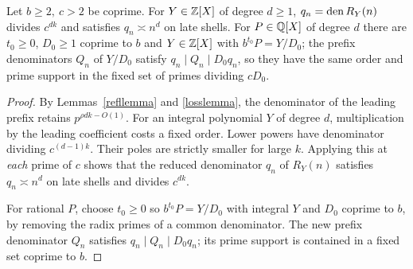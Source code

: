 \documentclass[11pt]{article}
\begin{document}
\begin{lemma}\label{poles}
Let \(b\ge2,\ c>2\) be coprime. For \(Y\in\mathbb Z[X]\) of degree \(d\ge1\), \(q_n=\operatorname{den} R_Y(n)\) divides
\(c^{dk}\) and satisfies \(q_n\asymp n^d\) on late shells.
For \(P\in\mathbb Q[X]\) of degree \(d\) there are \(t_0\ge0\), \(D_0\ge1\) coprime
to \(b\) and \(Y\in\mathbb Z[X]\) with \(b^{t_0}P=Y/D_0\); the prefix denominators
\(Q_n\) of \(Y/D_0\) satisfy \(q_n\mid Q_n\mid D_0q_n\), so they have the same
order and prime support in the fixed set of primes dividing \(cD_0\).
\end{lemma}
\begin{proof}
By Lemmas~\ref{refllemma} and \ref{losslemma}, the denominator of
the leading prefix retains \(p^{\rho dk-O(1)}\).
For an integral polynomial \(Y\) of degree \(d\), multiplication by the
leading coefficient costs a fixed order. Lower powers have denominator
dividing \(c^{(d-1)k}\). Their poles are strictly smaller for large \(k\).
Applying this at \emph{each} prime of \(c\) shows that the reduced
denominator \(q_n\) of \(R_Y(n)\) satisfies \(q_n\asymp n^d\) on late
shells and divides \(c^{dk}\).

For rational \(P\), choose \(t_0\ge0\) so \(b^{t_0}P=Y/D_0\) with integral
\(Y\) and \(D_0\) coprime to \(b\), by removing the radix primes of a common
denominator. The new prefix denominator \(Q_n\) satisfies
\(q_n\mid Q_n\mid D_0 q_n\); its prime support is contained in a fixed set coprime to \(b\).
\end{proof}
\end{document}
